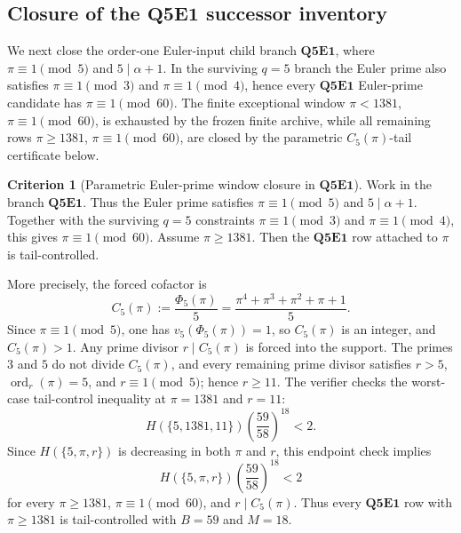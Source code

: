 \documentclass[11pt]{article}
\theoremstyle{definition}
\newtheorem{criterion}[theorem]{Criterion}
\theoremstyle{remark}
\begin{document}
\subsection{Closure of the \texorpdfstring{\(\mathbf{Q5E1}\)}{Q5E1} successor inventory}
\label{subsec:q5e1-successor-inventory-closure}

We next close the order-one Euler-input child branch
\(\mathbf{Q5E1}\), where \(\pi\equiv1\pmod5\) and \(5\mid\alpha+1\).  In the
surviving \(q=5\) branch the Euler prime also satisfies
\(\pi\equiv1\pmod3\) and \(\pi\equiv1\pmod4\), hence every
\(\mathbf{Q5E1}\) Euler-prime candidate has \(\pi\equiv1\pmod{60}\).  The
finite exceptional window \(\pi<1381\), \(\pi\equiv1\pmod{60}\), is exhausted
by the frozen finite archive, while all remaining rows
\(\pi\ge1381\), \(\pi\equiv1\pmod{60}\), are closed by the parametric
\(C_5(\pi)\)-tail certificate below.



\begin{criterion}[Parametric Euler-prime window closure in \texorpdfstring{\(\mathbf{Q5E1}\)}{Q5E1}]
\label{crit:q5e1-parametric-pi-window-closure}
Work in the branch \(\mathbf{Q5E1}\).  Thus the Euler prime satisfies
\(\pi\equiv1\pmod5\) and \(5\mid\alpha+1\).  Together with the surviving
\(q=5\) constraints \(\pi\equiv1\pmod3\) and \(\pi\equiv1\pmod4\), this gives
\(\pi\equiv1\pmod{60}\).  Assume \(\pi\ge1381\).  Then the
\(\mathbf{Q5E1}\) row attached to \(\pi\) is tail-controlled.

More precisely, the forced cofactor is
\[
  C_5(\pi)
  :=
  \frac{\Phi_5(\pi)}5
  =
  \frac{\pi^4+\pi^3+\pi^2+\pi+1}{5}.
\]
Since
\(\pi\equiv1\pmod5\), one has \(v_5(\Phi_5(\pi))=1\), so \(C_5(\pi)\) is an
integer, and \(C_5(\pi)>1\).  Any prime divisor \(r\mid C_5(\pi)\) is forced
into the support.  The primes \(3\) and \(5\) do not divide
\(C_5(\pi)\), and every remaining prime divisor satisfies
\(r>5\), \(\operatorname{ord}_r(\pi)=5\), and \(r\equiv1\pmod5\); hence
\(r\ge11\).  The verifier checks the worst-case tail-control inequality at
\(\pi=1381\) and \(r=11\):
\[
  H(\{5,1381,11\})
  \left(\frac{59}{58}\right)^{18}
  <2.
\]
Since \(H(\{5,\pi,r\})\) is decreasing in both \(\pi\) and \(r\), this endpoint
check implies
\[
  H(\{5,\pi,r\})
  \left(\frac{59}{58}\right)^{18}
  <2
\]
for every \(\pi\ge1381\), \(\pi\equiv1\pmod{60}\), and
\(r\mid C_5(\pi)\).  Thus every \(\mathbf{Q5E1}\) row with \(\pi\ge1381\) is
tail-controlled with \(B=59\) and \(M=18\).
\end{criterion}
\end{document}
